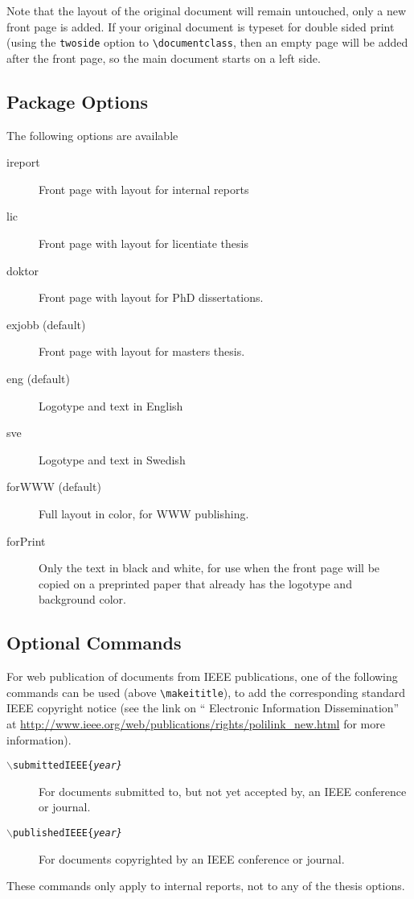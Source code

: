 \documentclass[a4paper]{article}
\begin{document}
Note that the layout of the original document will remain untouched,
only a new front page is added. If your original document is typeset
for double sided print (using the \verb+twoside+ option to
\verb+\documentclass+, then an empty page will be added after the
front page, so the main document starts on a left side. 


\subsection{Package Options}

The following options are available
\begin{description}
\item[ireport] Front page with layout for internal reports
\item[lic] Front page with layout for licentiate thesis
\item[doktor] Front page with layout for PhD dissertations.
\item[exjobb (default)] Front page with layout for masters thesis.
\item[eng (default)] Logotype and text in English
\item[sve] Logotype and text in Swedish
\item[forWWW (default)] Full layout in color, for WWW publishing.
\item[forPrint] Only the text in black and white, for use when the
  front page will be copied on a preprinted paper that already has the
  logotype and background color. 
\end{description}


\subsection{Optional Commands}

For web publication of documents from IEEE publications, one of the
following commands can be used (above \verb+\makeititle+), to add the
corresponding standard IEEE copyright notice (see the link on ``
Electronic Information Dissemination'' at
\url{http://www.ieee.org/web/publications/rights/polilink_new.html} 
for more information). 

\begin{description}
\item[\texttt{$\backslash$submittedIEEE\{\textit{year\}}}] For documents
  submitted to, but not yet accepted by, an IEEE conference or
  journal. 
\item[\texttt{$\backslash$publishedIEEE\{\textit{year\}}}] For documents
  copyrighted by an IEEE conference or journal. 
\end{description}

These commands only apply to internal reports, not to any of the
thesis options.
\end{document}
